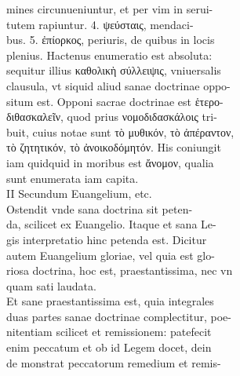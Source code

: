 \documentclass{article}
\begin{document}
\begin{pages}
                mines circunueniuntur, et per vim in serui- \\
                tutem rapiuntur. 4. ψεύσταις, mendaci- \\
                bus. 5. ἐπίορκος, periuris, de quibus in locis \\
                plenius. Hactenus enumeratio est absoluta: \\
                sequitur illius καθολικὴ σύλλειψις, vniuersalis \\
                clausula, vt siquid aliud sanae doctrinae oppo- \\
                situm est. Opponi sacrae doctrinae est ἑτερο- \\
                διθασκαλεῖν, quod prius νομοδιδασκάλοις tri- \\
                buit, cuius notae sunt τὸ μυθικόν, τὸ ἀπέραντον, \\
                τὸ  ζητητικόν, τὸ ἀνοικοδόμητόν. His coniungit \\
                iam quidquid in moribus est ἄνομον, qualia \\
                sunt enumerata iam capita. \\
                II Secundum Euangelium, etc. \\
                Ostendit vnde sana doctrina sit peten- \\
                da, scilicet ex Euangelio. Itaque et sana Le- \\
                gis interpretatio hinc petenda est. Dicitur \\
                autem Euangelium gloriae, vel quia est glo- \\
                riosa doctrina, hoc est, praestantissima, nec vn \\
                quam sati laudata. \\
                Et sane praestantissima est, quia integrales \\
                duas partes sanae doctrinae complectitur, poe- \\
                nitentiam scilicet et remissionem: patefecit \\
                enim peccatum et ob id Legem docet, dein \\
                de monstrat peccatorum remedium et remis- \\

\end{pages}
\end{document}
